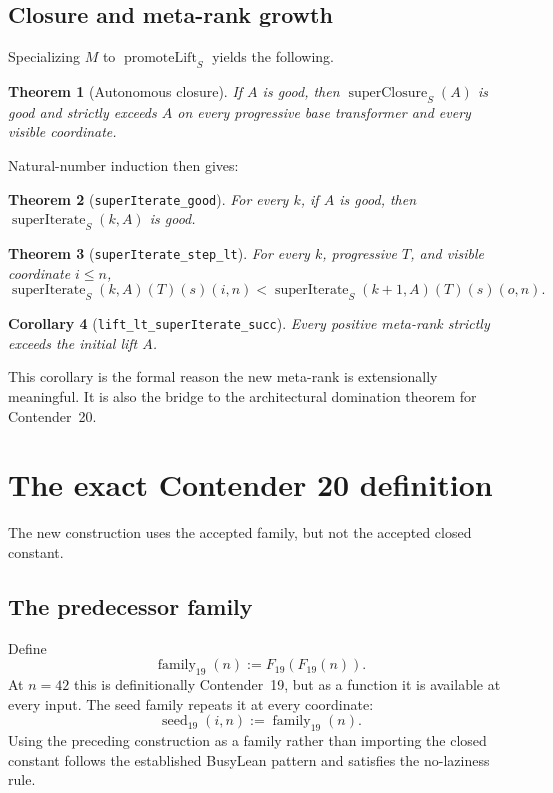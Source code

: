 \documentclass[11pt]{article}
\newtheorem{theorem}{Theorem}[section]
\newtheorem{corollary}[theorem]{Corollary}
\theoremstyle{definition}
\theoremstyle{remark}
\newcommand{\leanname}[1]{\nolinkurl{#1}}
\begin{document}
\subsection{Closure and meta-rank growth}

Specializing $M$ to $\operatorname{promoteLift}_S$ yields the following.

\begin{theorem}[Autonomous closure]
If $A$ is good, then $\operatorname{superClosure}_S(A)$ is good and strictly
exceeds $A$ on every progressive base transformer and every visible coordinate.
\end{theorem}

Natural-number induction then gives:

\begin{theorem}[\leanname{superIterate_good}]
For every $k$, if $A$ is good, then
$\operatorname{superIterate}_S(k,A)$ is good.
\end{theorem}

\begin{theorem}[\leanname{superIterate_step_lt}]
For every $k$, progressive $T$, and visible coordinate $i\le n$,
\[
 \operatorname{superIterate}_S(k,A)(T)(s)(i,n)
 <\operatorname{superIterate}_S(k+1,A)(T)(s)(o,n).
\]
\end{theorem}

\begin{corollary}[\leanname{lift_lt_superIterate_succ}]
Every positive meta-rank strictly exceeds the initial lift $A$.
\end{corollary}

This corollary is the formal reason the new meta-rank is extensionally
meaningful.  It is also the bridge to the architectural domination theorem for
Contender~20.

\section{The exact Contender 20 definition}

The new construction uses the accepted family, but not the accepted closed
constant.

\subsection{The predecessor family}

Define
\[
  \operatorname{family}_{19}(n):=F_{19}(F_{19}(n)).
\]
At $n=42$ this is definitionally Contender~19, but as a function it is available
at every input.  The seed family repeats it at every coordinate:
\[
  \operatorname{seed}_{19}(i,n):=\operatorname{family}_{19}(n).
\]
Using the preceding construction as a family rather than importing the closed
constant follows the established BusyLean pattern and satisfies the no-laziness
rule.
\end{document}
